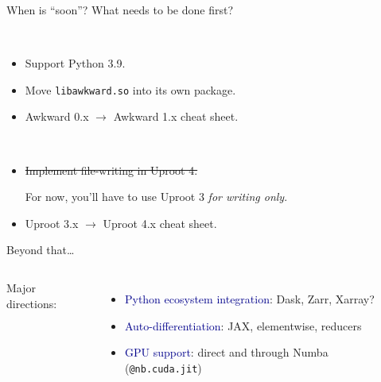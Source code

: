 \documentclass[aspectratio=169]{beamer}
\begin{document}
\begin{frame}{When is ``soon''? What needs to be done first?}
\large
\vspace{0.5 cm}

\begin{description}\setlength{\itemsep}{0.5 cm}
\item[\Large Awkward Array:] \mbox{ } \\

\vspace{0.3 cm}
\begin{itemize}\setlength{\itemsep}{0.2 cm}
\item Support Python 3.9.

\item Move \texttt{libawkward.so} into its own package.

\item Awkward 0.x $\to$ Awkward 1.x cheat sheet.
\end{itemize}

\item[\Large Uproot:] \mbox{ } \\

\vspace{0.2 cm}
\begin{itemize}\setlength{\itemsep}{0.2 cm}
\item \sout{Implement file-writing in Uproot 4.}

For now, you'll have to use Uproot 3 {\it for writing only}.

\item Uproot 3.x $\to$ Uproot 4.x cheat sheet.
\end{itemize}
\end{description}

\vspace{0.65 cm}
\end{frame}

\begin{frame}{Beyond that\ldots}
\large
\vspace{0.5 cm}
\begin{columns}
{\Large Major directions:}

\vspace{0.25 cm}
\begin{itemize}\setlength{\itemsep}{0.25 cm}
\item \textcolor{darkblue}{Python ecosystem integration}: Dask, Zarr, Xarray?
\item \textcolor{darkblue}{Auto-differentiation}: JAX, elementwise, reducers
\item \textcolor{darkblue}{GPU support}: direct and through Numba (\texttt{@nb.cuda.jit})
\end{itemize}
\end{columns}
\end{frame}
\end{document}
